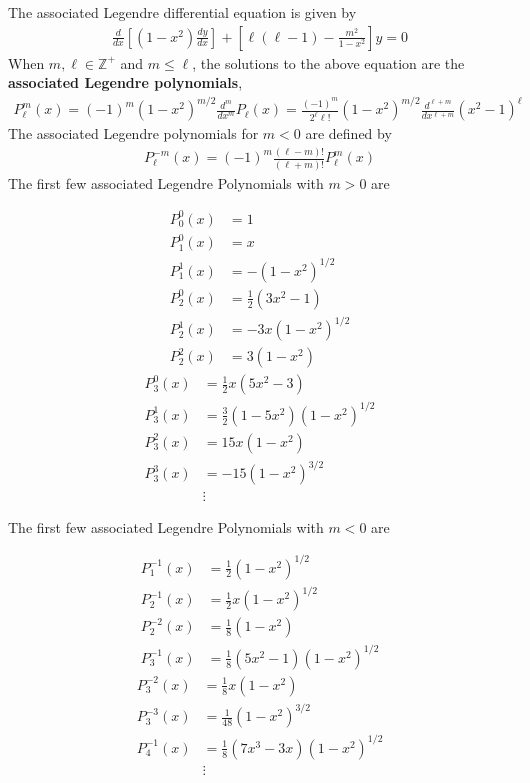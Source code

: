 The associated Legendre differential equation is given by
\begin{align}
	\frac{d}{dx}\left[(1-x^2)\frac{dy}{dx}\right]
	+\left[\ell(\ell-1)-\frac{m^2}{1-x^2}\right]y=0
\end{align}
When $m,\ell \in \mathbb{Z}^+$ and $m \leq \ell$, the solutions to the above  equation are the \textbf{associated Legendre polynomials},
\begin{align}
	P_\ell^m(x) = (-1)^m(1-x^2)^{m/2}\frac{d^m}{dx^m}P_\ell(x) = \frac{(-1)^m}{2^\ell \ell!}(1-x^2)^{m/2}	\frac{d^{\ell+m}}{dx^{\ell+m}}(x^2-1)^\ell
\end{align}
The associated Legendre polynomials for $m < 0$ are defined by
\begin{align}
	P_\ell^{-m}(x) = (-1)^m \frac{(\ell - m)!}{(\ell+m)!}P_\ell^m(x)
\end{align}
The first few associated Legendre Polynomials with $m>0$ are
\begin{multicols}{2}
	\noindent
	\begin{align}
		P_0^0(x) &= 1 \\
		P_1^0(x) &= x \\
		P_1^1(x) &= -(1-x^2)^{1/2} \\
		P_2^0(x) &=\frac{1}{2}(3x^2-1) \\
		P_2^1(x) &= -3x(1-x^2)^{1/2} \\
		P_2^2(x) &= 3(1-x^2)
	\end{align}
	\begin{align}
		P_3^0(x) &= \frac{1}{2}x(5x^2-3) \\
		P_3^1(x) &= \frac{3}{2}(1-5x^2)(1-x^2)^{1/2} \\
		P_3^2(x) &= 15x(1-x^2) \\
		P_3^3(x) &= -15(1-x^2)^{3/2} \\
		&\vdots \nonumber
	\end{align}
\end{multicols}
The first few associated Legendre Polynomials with $m<0$ are
\begin{multicols}{2}
	\noindent
	\begin{align}
		P_1^{-1}(x) &= \frac{1}{2}(1-x^2)^{1/2} \\
		P_2^{-1}(x) &= \frac{1}{2}x(1-x^2)^{1/2} \\
		P_2^{-2}(x) &= \frac{1}{8}(1-x^2) \\
		P_3^{-1}(x) &= \frac{1}{8}(5x^2-1)(1-x^2)^{1/2} 
	\end{align}
	\begin{align}
		P_3^{-2}(x) &= \frac{1}{8}x(1-x^2) \\
		P_3^{-3}(x) &= \frac{1}{48}(1-x^2)^{3/2} \\
		P_4^{-1}(x) &= \frac{1}{8}(7x^3-3x)(1-x^2)^{1/2}\\
		&\vdots \nonumber
	\end{align}
\end{multicols}
